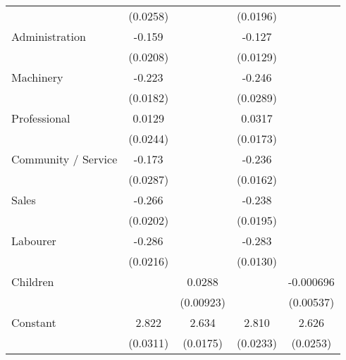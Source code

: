 {\begin{tabular}{l*{4}{c}}
                    &    (0.0258)         &                     &    (0.0196)         &                     \\
[1em]
Administration      &      -0.159\sym{***}&                     &      -0.127\sym{***}&                     \\
                    &    (0.0208)         &                     &    (0.0129)         &                     \\
[1em]
Machinery           &      -0.223\sym{***}&                     &      -0.246\sym{***}&                     \\
                    &    (0.0182)         &                     &    (0.0289)         &                     \\
[1em]
Professional        &      0.0129         &                     &      0.0317         &                     \\
                    &    (0.0244)         &                     &    (0.0173)         &                     \\
[1em]
Community / Service &      -0.173\sym{***}&                     &      -0.236\sym{***}&                     \\
                    &    (0.0287)         &                     &    (0.0162)         &                     \\
[1em]
Sales               &      -0.266\sym{***}&                     &      -0.238\sym{***}&                     \\
                    &    (0.0202)         &                     &    (0.0195)         &                     \\
[1em]
Labourer            &      -0.286\sym{***}&                     &      -0.283\sym{***}&                     \\
                    &    (0.0216)         &                     &    (0.0130)         &                     \\
[1em]
Children            &                     &      0.0288\sym{**} &                     &   -0.000696         \\
                    &                     &   (0.00923)         &                     &   (0.00537)         \\
[1em]
Constant            &       2.822\sym{***}&       2.634\sym{***}&       2.810\sym{***}&       2.626\sym{***}\\
                    &    (0.0311)         &    (0.0175)         &    (0.0233)         &    (0.0253)         \\

\end{tabular}}
